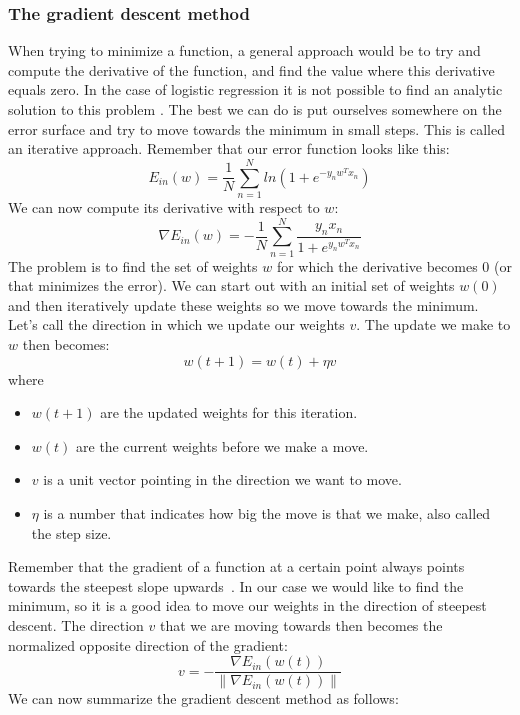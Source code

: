 \subsubsection{The gradient descent method}
\label{subsubsec:glm-gradient-descent}
When trying to minimize a function, a general approach would be to try and compute the derivative of the function, and find the value where this derivative equals zero. In the case of logistic regression it is not possible to find an analytic solution to this problem \cite{caltechmachinelearning}. The best we can do is put ourselves somewhere on the error surface and try to move towards the minimum in small steps. This is called an iterative approach. Remember that our error function looks like this:
$$
E_{in}(w) = \frac{1}{N}\sum_{n=1}^{N}ln(1+e^{-y_{n}w^{T}x_{n}})
$$
We can now compute its derivative with respect to $w$:
$$
\nabla E_{in}(w) = -\frac{1}{N}\sum_{n=1}^{N}\frac{y_{n}x_{n}}{1+e^{y_{n}w^{T}x_{n}}}
$$
The problem is to find the set of weights $w$ for which the derivative becomes 0 (or that minimizes the error). We can start out with an initial set of weights $w(0)$ and then iteratively update these weights so we move towards the minimum. Let's call the direction in which we update our weights $v$. The update we make to $w$ then becomes:
$$
w(t+1) = w(t) + \eta v
$$
where
\begin{itemize}
	\item $w(t+1)$ are the updated weights for this iteration.
	\item $w(t)$ are the current weights before we make a move.
	\item $v$ is a unit vector pointing in the direction we want to move.
	\item $\eta$ is a number that indicates how big the move is that we make, also called the step size.
\end{itemize}
Remember that the gradient of a function at a certain point always points towards the steepest slope upwards~\cite{gradientdirection}\cite{gradientdirection2}. In our case we would like to find the minimum, so it is a good idea to move our weights in the direction of steepest descent. The direction $v$ that we are moving towards then becomes the normalized opposite direction of the gradient:
$$
v = -\frac{\nabla E_{in}(w(t))}{\lVert\nabla E_{in}(w(t))\rVert}
$$
We can now summarize the gradient descent method as follows:

